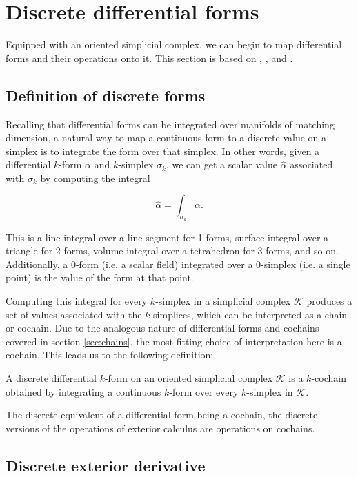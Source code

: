 \documentclass[utf8,english]{gradu3}
\begin{document}
\section{Discrete differential forms}

Equipped with an oriented simplicial complex,
we can begin to map differential forms and their operations onto it.
This section is based on \parencite{desbrun_discrete_2006},
\parencite{crane_digital_2013}, and \parencite{blair_perot_differential_2014}.


\subsection{Definition of discrete forms}\label{sec:discrete_forms}

Recalling that differential forms can be integrated
over manifolds of matching dimension,
a natural way to map a continuous form to a discrete value on a simplex
is to integrate the form over that simplex.
In other words, given a differential $k$-form $\alpha$
and $k$-simplex $\sigma_k$, we can get a scalar value $\widehat{\alpha}$
associated with $\sigma_k$ by computing the integral

\[
  \widehat{\alpha} = \int_{\sigma_k} \alpha.
\]

This is a line integral over a line segment for 1-forms,
surface integral over a triangle for 2-forms,
volume integral over a tetrahedron for 3-forms, and so on.
Additionally, a 0-form (i.e. a scalar field)
integrated over a 0-simplex (i.e. a single point)
is the value of the form at that point.

Computing this integral for every $k$-simplex in a simplicial complex $\mathcal{K}$
produces a set of values associated with the $k$-simplices,
which can be interpreted as a chain or cochain.
Due to the analogous nature of differential forms and cochains
covered in section \ref{sec:chains},
the most fitting choice of interpretation here is a cochain.
This leads us to the following definition:

A discrete differential $k$-form on an oriented simplicial complex $\mathcal{K}$
is a $k$-cochain obtained by integrating a continuous $k$-form
over every $k$-simplex in $\mathcal{K}$.

The discrete equivalent of a differential form being a cochain,
the discrete versions of the operations of exterior calculus
are operations on cochains.


\subsection{Discrete exterior derivative}\label{sec:disc_ext_der}
\end{document}
